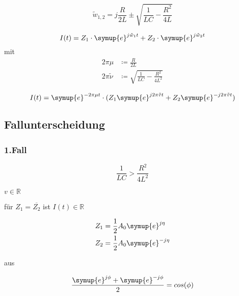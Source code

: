     \begin{equation}
        \tilde{w}_{1,2} = j \frac{R}{2L} \pm \sqrt{\frac{1}{LC}-\frac{R^2}{4L}} \nonumber
    \end{equation}
    
    \begin{equation}
        I(t) = Z_1 \cdot \symup{e}^{j \tilde{w}_1t} + Z_2 \cdot \symup{e}^{j\tilde{w}_2 t} \nonumber
    \end{equation}
    mit 
    \begin{align}
        2 \pi \mu & \coloneq \frac{R}{2L} \nonumber\\ 
        2 \pi \tilde{\nu} & \coloneq \sqrt{\frac{1}{LC} - \frac{R^2}{4L^2}} \nonumber
    \end{align}

    \begin{equation}
        I(t) = \symup{e}^{- 2 \pi \mu t} \cdot  (Z_1 \symup{e}^{j 2\pi \tilde{v}t} + Z_2 \symup{e}^{-j 2\pi \tilde{v} t}) \nonumber
    \end{equation}

    \subsection{Fallunterscheidung}

        \subsubsection{1.Fall}

        \begin{equation}
            \frac{1}{LC} > \frac{R^2}{4L^2}  \nonumber
        \end{equation}
        
        $v \in \mathds{R}$
       
        für $Z_1 = \overline{Z_2}$ ist $I(t) \in \mathds{R}$ 

        \begin{align}
            Z_1 & = \frac{1}{2} A_0 \symup{e}^{j \eta } \nonumber\\
            Z_2 & = \frac{1}{2} A_0 \symup{e}^{-j \eta} \nonumber
        \end{align}

        aus

        \begin{equation}
            \frac{\symup{e}^{j \phi} + \symup{e}^{-j \phi}}{2} = cos(\phi) \nonumber
        \end{equation}


